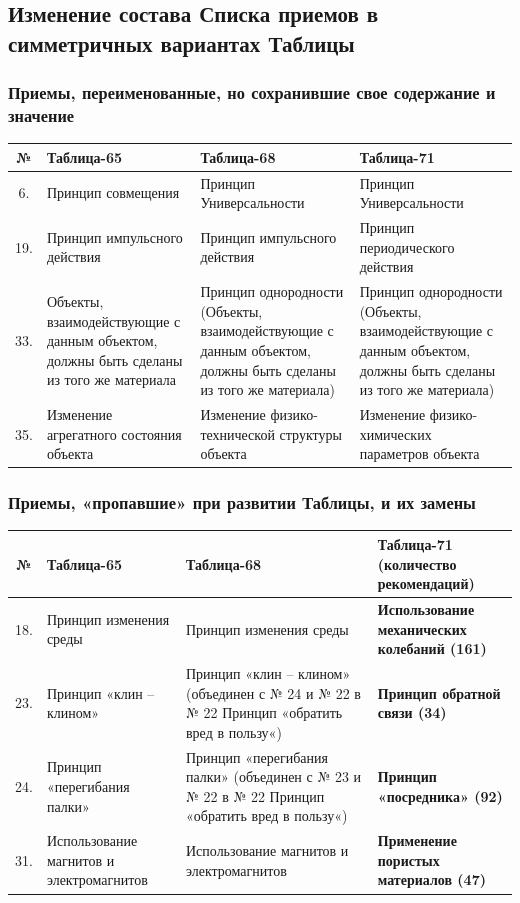 \documentclass[11pt,a4paper]{article}
\begin{document}
\subsection*{Изменение состава Списка приемов в симметричных вариантах
  Таблицы} 

\subsubsection*{Приемы, переименованные, но сохранившие свое содержание и
  значение}

\begin{center}
  \begin{tabular}{|c|p{}|p{}|p{}|}\hline
    № & Таблица-65 & Таблица-68 & Таблица-71\\\hline
    6.  & Принцип совмещения & Принцип Универсальности & Принцип
    Универсальности\\\hline        
    19. & Принцип импульсного действия & Принцип импульсного действия &
    Принцип периодического действия\\\hline
    33. & Объекты, взаимодействующие с данным объектом, должны быть сделаны из
    того же материала & Принцип однородности (Объекты, взаимодействующие с
    данным объектом, должны быть сделаны из того же материала) & Принцип
    однородности (Объекты, взаимодействующие с данным объектом, должны быть
    сделаны из того же материала)\\\hline
    35. & Изменение агрегатного состояния объекта & Изменение
    физико-технической структуры объекта & Изменение физико-химических
    параметров объекта\\\hline
  \end{tabular}

\subsubsection*{Приемы, «пропавшие» при развитии Таблицы, и их замены}
  \begin{tabular}{|c|p{}|p{}|p{}|}\hline
    № & Таблица-65 & Таблица-68 & Таблица-71 (количество рекомендаций)\\\hline
    18. & Принцип изменения среды & Принцип изменения среды &
    \textbf{Использование механических колебаний (161)}\\\hline
    23. & Принцип «клин -- клином» & Принцип «клин -- клином» (объединен с №
    24 и № 22 в № 22 Принцип «обратить вред в пользу«) & \textbf{Принцип
      обратной связи (34)}\\\hline
    24. & Принцип «перегибания палки» & Принцип «перегибания палки» (объединен
    с № 23 и № 22 в № 22 Принцип «обратить вред в пользу«) & \textbf{Принцип
      «посредника» (92)}\\\hline
    31. & Использование магнитов и электромагнитов & Использование магнитов и
    электромагнитов & \textbf{Применение пористых материалов (47)}\\\hline
  \end{tabular}
\end{center}
\end{document}
